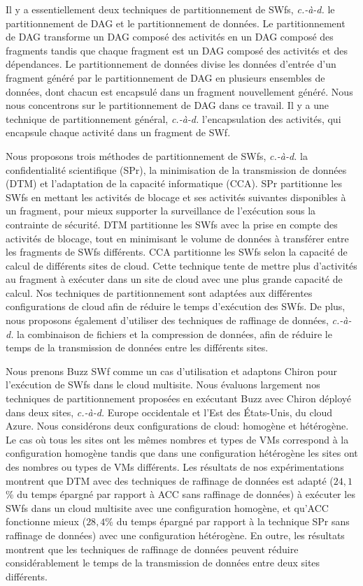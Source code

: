 Il y a essentiellement deux techniques de partitionnement de SWfs, \textit{c.-à-d.} le partitionnement de DAG et le partitionnement de données. Le partitionnement de DAG transforme un DAG composé des activités en un DAG composé des fragments tandis que chaque fragment est un DAG composé des activités et des dépendances.
Le partitionnement de données divise les données d'entrée d'un fragment généré par le partitionnement de DAG en plusieurs ensembles de données, dont chacun est encapsulé dans un fragment nouvellement généré. Nous nous concentrons sur le partitionnement de DAG dans ce travail. Il y a une technique de partitionnement général, \textit{c.-à-d.} l'encapsulation des activités, qui encapsule chaque activité dans un fragment de SWf.

Nous proposons trois méthodes de partitionnement de SWfs, \textit{c.-à-d.} la  confidentialité scientifique (SPr), la minimisation de la transmission de données (DTM) et l'adaptation de la capacité informatique (CCA). SPr partitionne les SWfs en mettant les activités de blocage et ses activités suivantes disponibles à un fragment, pour mieux supporter la surveillance de l'exécution sous la contrainte de sécurité. DTM partitionne les SWfs avec la prise en compte des activités de blocage, tout en minimisant le volume de données à transférer entre les fragments de SWfs différents. CCA partitionne les SWfs selon la capacité de calcul de différents sites de cloud. Cette technique tente de mettre plus d'activités au fragment à exécuter dans un site de cloud avec une plus grande capacité de calcul.
Nos techniques de partitionnement sont adaptées aux différentes configurations de cloud afin de réduire le temps d'exécution des SWfs. De plus, nous  proposons également d'utiliser des techniques de raffinage de données, \textit{c.-à-d.} la combinaison de fichiers et la compression de données, afin de réduire le temps de la transmission de données entre les différents sites.

Nous prenons Buzz SWf \cite{Dias2013} comme un cas d'utilisation et adaptons Chiron pour l'exécution de SWfs dans le cloud multisite. Nous évaluons largement nos techniques de partitionnement proposées en exécutant Buzz avec Chiron déployé dans deux sites, \textit{c.-à-d.} Europe occidentale et l'Est des États-Unis, du cloud Azure.
Nous considérons deux configurations de cloud: homogène et hétérogène. Le cas où tous les sites ont les mêmes nombres et types de VMs correspond à la configuration homogène tandis que dans une configuration hétérogène les sites ont des nombres ou types de VMs différents. Les résultats de nos expérimentations montrent que DTM avec des techniques de raffinage de données est adapté ($24,1$\% du temps épargné par rapport à ACC sans raffinage de données) à exécuter les SWfs dans un cloud multisite avec une configuration homogène, et qu'ACC fonctionne mieux ($28,4$\% du temps épargné par rapport à la technique SPr sans raffinage de données) avec une configuration hétérogène. En outre, les résultats montrent que les techniques de raffinage de données peuvent réduire considérablement le temps de la transmission de données entre deux sites différents.

